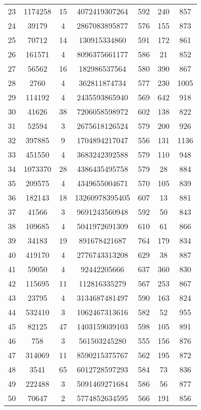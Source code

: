 \documentclass[tikz, 12pt]{scrartcl}
\begin{document}
\begin{longtable}{|c|cc|cc|cc|}
23	 &1174258	 & 	15	 &4072419307264	 & 	592	 &240	 & 	857\\
24	 &39179	 & 	4	 &2867083895877	 & 	576	 &155	 & 	873\\
25	 &70712	 & 	14	 &130915334860	 & 	591	 &172	 & 	861\\
26	 &161571	 & 	4	 &8096375661177	 & 	586	 &21	 & 	852\\
27	 &56562	 & 	16	 &182986537564	 & 	580	 &390	 & 	867\\
28	 &2760	 & 	4	 &362811874734	 & 	577	 &230	 & 	1005\\
29	 &114192	 & 	4	 &2435593865940	 & 	569	 &642	 & 	918\\
30	 &41626	 & 	38	 &7206058598972	 & 	602	 &138	 & 	822\\
31	 &52594	 & 	3	 &2675618126524	 & 	579	 &200	 & 	926\\
32	 &397885	 & 	9	 &1704894217047	 & 	556	 &131	 & 	1136\\
33	 &451550	 & 	4	 &3683242392588	 & 	579	 &110	 & 	948\\
34	 &1073370	 & 	28	 &4386435495758	 & 	579	 &28	 & 	884\\
35	 &209575	 & 	4	 &4349655004671	 & 	570	 &105	 & 	839\\
36	 &182143	 & 	18	 &13260978395405	 & 	607	 &13	 & 	881\\
37	 &41566	 & 	3	 &9691243560948	 & 	592	 &50	 & 	843\\
38	 &109685	 & 	4	 &5041972691309	 & 	610	 &61	 & 	866\\
39	 &34183	 & 	19	 &891678421687	 & 	764	 &179	 & 	834\\
40	 &419170	 & 	4	 &2776743313208	 & 	629	 &38	 & 	887\\
41	 &59050	 & 	4	 &92442205666	 & 	637	 &360	 & 	830\\
42	 &115695	 & 	11	 &112816335279	 & 	567	 &253	 & 	867\\
43	 &23795	 & 	4	 &3134687481497	 & 	590	 &163	 & 	824\\
44	 &532410	 & 	3	 &1062467313616	 & 	582	 &52	 & 	955\\
45	 &82125	 & 	47	 &1403159039103	 & 	598	 &105	 & 	891\\
46	 &758	 & 	3	 &561503245280	 & 	555	 &156	 & 	876\\
47	 &314069	 & 	11	 &8590215375767	 & 	562	 &195	 & 	872\\
48	 &3541	 & 	65	 &6012728597293	 & 	584	 &73	 & 	836\\
49	 &222488	 & 	3	 &5091469271684	 & 	586	 &56	 & 	877\\
50	 &70647	 & 	2	 &5774852634595	 & 	566	 &191	 & 	856\\
\hline
\end{longtable}
\end{document}
